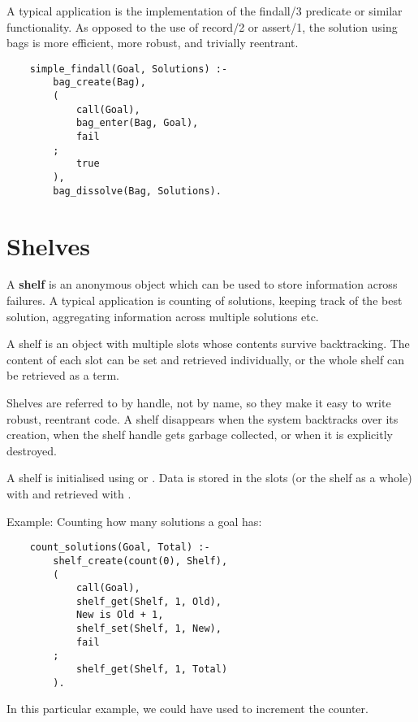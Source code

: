 A typical application is the
implementation of the findall/3 predicate or similar functionality. 
As opposed to the use of record/2 or assert/1, the solution using
bags is more efficient, more robust, and trivially reentrant.
\begin{verbatim}
    simple_findall(Goal, Solutions) :-
        bag_create(Bag),
        (
            call(Goal),
            bag_enter(Bag, Goal),
            fail
        ;
            true
        ),
        bag_dissolve(Bag, Solutions).
\end{verbatim}
    

\section{Shelves}

A {\bf shelf} is an anonymous object which can be used to store information
across failures.  A typical application is counting of solutions,
keeping track of the best solution, aggregating information across
multiple solutions etc. 

A shelf is an object with multiple slots whose contents survive
backtracking.  The content of each slot can be set and retrieved
individually, or the whole shelf can be retrieved as a term. 

Shelves are referred to by handle, not by name, so they make it easy
to write robust, reentrant code.  A shelf disappears when the system
backtracks over its creation, when the shelf handle gets garbage
collected, or when it is explicitly destroyed. 

A shelf is initialised using
 or
.
Data is stored in the slots (or the shelf as a whole) with
and retrieved with
.

Example: Counting how many solutions a goal has:
\begin{verbatim}
    count_solutions(Goal, Total) :-
        shelf_create(count(0), Shelf),
        (
            call(Goal),
            shelf_get(Shelf, 1, Old),
            New is Old + 1,
            shelf_set(Shelf, 1, New),
            fail
        ;
            shelf_get(Shelf, 1, Total)
        ).
\end{verbatim}
In this particular example, we could have used
 to
increment the counter.


